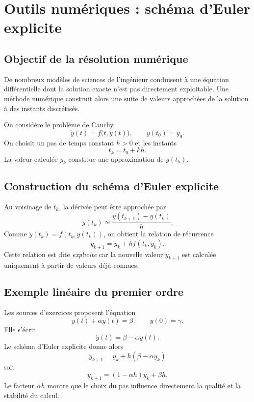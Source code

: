 \chapter{Outils numériques : schéma d'Euler explicite}

\section{Objectif de la résolution numérique}
De nombreux modèles de sciences de l'ingénieur conduisent à une équation différentielle dont la solution exacte n'est pas directement exploitable. Une méthode numérique construit alors une suite de valeurs approchées de la solution à des instants discrétisés.

On considère le problème de Cauchy
\[
\dot y(t)=f\bigl(t,y(t)\bigr),\qquad y(t_0)=y_0.
\]
On choisit un pas de temps constant $h>0$ et les instants
\[
t_k=t_0+kh.
\]
La valeur calculée $y_k$ constitue une approximation de $y(t_k)$.

\begin{center}
\TLEulerGeometrique
\end{center}

\section{Construction du schéma d'Euler explicite}
Au voisinage de $t_k$, la dérivée peut être approchée par
\[
\dot y(t_k)\simeq \frac{y(t_{k+1})-y(t_k)}{h}.
\]
Comme $\dot y(t_k)=f(t_k,y(t_k))$, on obtient la relation de récurrence
\[
\boxed{y_{k+1}=y_k+h f(t_k,y_k)}.
\]
Cette relation est dite \emph{explicite} car la nouvelle valeur $y_{k+1}$ est calculée uniquement à partir de valeurs déjà connues.

\begin{center}
\TLAlgorithmeEuler
\end{center}

\section{Exemple linéaire du premier ordre}
Les sources d'exercices proposent l'équation
\[
\dot y(t)+\alpha y(t)=\beta,\qquad y(0)=\gamma.
\]
Elle s'écrit
\[
\dot y(t)=\beta-\alpha y(t).
\]
Le schéma d'Euler explicite donne alors
\[
\boxed{y_{k+1}=y_k+h\left(\beta-\alpha y_k\right)}
\]
soit
\[
y_{k+1}=(1-\alpha h)y_k+\beta h.
\]
Le facteur $\alpha h$ montre que le choix du pas influence directement la qualité et la stabilité du calcul.

